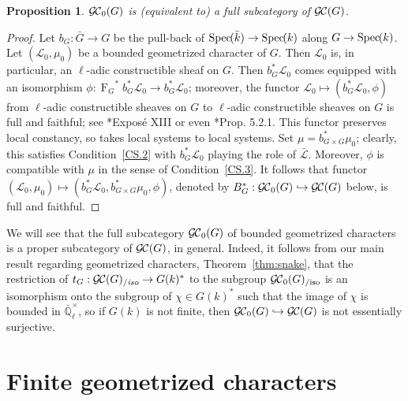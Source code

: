 \documentclass[11pt]{amsart}
\theoremstyle{plain}
\newtheorem{proposition}[theorem]{Proposition}
\theoremstyle{definition}
\theoremstyle{remark}
\newcommand{\Spec}[1]{{\operatorname{Spec}\hskip-1pt( #1 )}}
\newcommand{\EE}{\mathbb{\bar Q}_\ell}
\newcommand{\bFq}{\bar{k}}
\newcommand{\Fq}{k}
\newcommand{\EEx}{\EE^\times}
\newcommand{\Frob}[1]{{\operatorname{F}_{#1}}}
\newcommand{\cs}[1]{{\mathcal{#1}}}
\newcommand{\gcs}[1]{{\mathcal{\bar #1}}}
\newcommand{\GC}{{\mathcal{G\hskip-0.8pt C}}}
\newcommand{\GCb}{{\GC_0}}
\newcommand{\GCiso}[1]{\GC(#1)_{/\textit{iso}}}
\newcommand{\GCbiso}[1]{\GCb(#1)_{/\text{iso}}}
\newcommand{\trFrob}[1]{t_{#1}}
\begin{document}
\begin{proposition}
$\GCb(G)$ is (equivalent to) a full subcategory of $\GC(G)$.
\end{proposition}

\begin{proof}
 Let $b_G : {\bar G} \to G$ be the pull-back of $\Spec{\bFq} \to \Spec{\Fq}$ along $G\to \Spec{\Fq}$.
 Let $(\cs{L}_0,\mu_0)$ be a bounded geometrized character of $G$. 
 Then $\cs{L}_0$ is, in particular, an $\ell$-adic constructible sheaf on $G$. 
 Then $b_G^* \cs{L}_0$ comes equipped with an isomorphism 
 $\phi : \Frob{G}^* b_G^*\cs{L}_0 \to b_G^* \cs{L}_0$; 
 moreover, the functor $\cs{L}_0 \mapsto (b_G^* \cs{L}_0,\phi)$  
 from $\ell$-adic constructible sheaves on $G$ to $\ell$-adic constructible sheaves on $G$
 is full and faithful; see \cite{SGA7.2}*{Expos\'e XIII} or even \cite{BBD}*{Prop. 5.2.1}. 
 This functor preserves local constancy, so takes local systems to local systems. 
 Set $\mu = b_{G\times G}^*\mu_0$; clearly, this satisfies Condition~\ref{CS.2} 
 with $b_G^*\cs{L}_0$ playing the role of $\gcs{L}$.
 Moreover, $\phi$ is compatible with $\mu$ in the sense of Condition~\ref{CS.3}.
 It follows that functor $(\cs{L}_0,\mu_0) \mapsto (b_G^*\cs{L}_0,b_{G\times G}^* \mu_0, \phi)$, denoted by  $B_G^*: \GCb(G) \hookrightarrow \GC(G)$ below, is full and faithful.
\end{proof}

We will see that the full subcategory $\GC_0(G)$ of bounded geometrized characters is a proper subcategory of $\GC(G)$, in general. Indeed, it follows from our main result regarding geometrized characters, Theorem~\ref{thm:snake}, that the restriction of $\trFrob{G} : \GCiso{G} \to G(\Fq)^*$ to the subgroup $\GCbiso{G}$ is an isomorphism onto the subgroup of $\chi \in G(\Fq)^*$ such that the image of $\chi$ is bounded in $\EEx$, so if $G(\Fq)$ is not finite, then $\GC_0(G) \hookrightarrow\GC(G)$ is not essentially surjective.

\section{Finite geometrized characters}\label{sec:finite}

 
\end{document}
